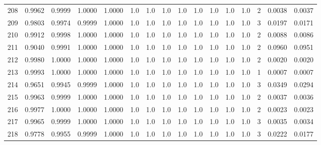 \begin{tabular}{lrrrrrrrrrrrrrrr}
208 &      0.9962 &  0.9999 &  1.0000 &  1.0000 &     1.0 &     1.0 &     1.0 &     1.0 &     1.0 &     1.0 &      1.0 &        1.0 &      2 &                    0.0038 &                     0.0037 \\
209 &      0.9803 &  0.9974 &  0.9999 &  1.0000 &     1.0 &     1.0 &     1.0 &     1.0 &     1.0 &     1.0 &      1.0 &        1.0 &      3 &                    0.0197 &                     0.0171 \\
210 &      0.9912 &  0.9998 &  1.0000 &  1.0000 &     1.0 &     1.0 &     1.0 &     1.0 &     1.0 &     1.0 &      1.0 &        1.0 &      2 &                    0.0088 &                     0.0086 \\
211 &      0.9040 &  0.9991 &  1.0000 &  1.0000 &     1.0 &     1.0 &     1.0 &     1.0 &     1.0 &     1.0 &      1.0 &        1.0 &      2 &                    0.0960 &                     0.0951 \\
212 &      0.9980 &  1.0000 &  1.0000 &  1.0000 &     1.0 &     1.0 &     1.0 &     1.0 &     1.0 &     1.0 &      1.0 &        1.0 &      2 &                    0.0020 &                     0.0020 \\
213 &      0.9993 &  1.0000 &  1.0000 &  1.0000 &     1.0 &     1.0 &     1.0 &     1.0 &     1.0 &     1.0 &      1.0 &        1.0 &      1 &                    0.0007 &                     0.0007 \\
214 &      0.9651 &  0.9945 &  0.9999 &  1.0000 &     1.0 &     1.0 &     1.0 &     1.0 &     1.0 &     1.0 &      1.0 &        1.0 &      3 &                    0.0349 &                     0.0294 \\
215 &      0.9963 &  0.9999 &  1.0000 &  1.0000 &     1.0 &     1.0 &     1.0 &     1.0 &     1.0 &     1.0 &      1.0 &        1.0 &      2 &                    0.0037 &                     0.0036 \\
216 &      0.9977 &  1.0000 &  1.0000 &  1.0000 &     1.0 &     1.0 &     1.0 &     1.0 &     1.0 &     1.0 &      1.0 &        1.0 &      2 &                    0.0023 &                     0.0023 \\
217 &      0.9965 &  0.9999 &  1.0000 &  1.0000 &     1.0 &     1.0 &     1.0 &     1.0 &     1.0 &     1.0 &      1.0 &        1.0 &      3 &                    0.0035 &                     0.0034 \\
218 &      0.9778 &  0.9955 &  0.9999 &  1.0000 &     1.0 &     1.0 &     1.0 &     1.0 &     1.0 &     1.0 &      1.0 &        1.0 &      3 &                    0.0222 &                     0.0177 \\

\end{tabular}
